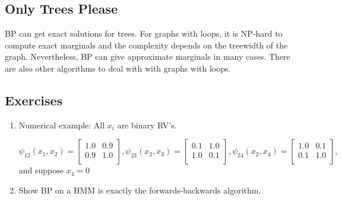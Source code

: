 \documentclass{harvardml}
\theoremstyle{definition}
\theoremstyle{plain}
\theoremstyle{definition}
\theoremstyle{remark}
\begin{document}
\subsection{Only Trees Please}
BP can get exact solutions for trees. For graphs with loops, it is NP-hard to compute exact marginals and the complexity depends on the treewidth of the graph. Nevertheless, BP can give approximate marginals in many cases. There are also other algorithms to deal with with graphs with loops.


\subsection{Exercises}
\begin{enumerate}
    \item Numerical example: All $x_i$ are binary RV's.
    \medskip 
    \begin{center}
    \end{center}

$\psi_{12}(x_1, x_2) = \begin{bmatrix}
1.0 & 0.9\\
0.9 & 1.0\\
\end{bmatrix}, \psi_{23}(x_2, x_3) = \begin{bmatrix}
0.1 & 1.0\\
1.0 & 0.1\\
\end{bmatrix},\psi_{24}(x_2, x_4) = \begin{bmatrix}
1.0 & 0.1\\
0.1 & 1.0\\
\end{bmatrix},$ and suppose $x_4=0$
    
    
\item Show BP on a HMM is exactly the forwards-backwards algorithm. 
\end{enumerate}
\end{document}

